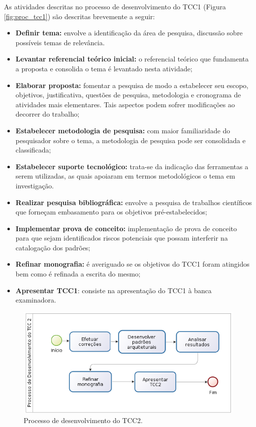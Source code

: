 As atividades descritas no processo de desenvolvimento do TCC1 (Figura \ref{fig:proc_tcc1}) são descritas brevemente a seguir:

\begin{itemize}
    \item \textbf{Definir tema:} envolve a identificação da área de pesquisa, discussão sobre possíveis temas de relevância.
    \item \textbf{Levantar referencial teórico inicial:} o referencial teórico que fundamenta a proposta e consolida o tema é levantado nesta atividade;
    \item \textbf{Elaborar proposta:} fomentar a pesquisa de modo a estabelecer seu escopo, objetivos, justificativa, questões de pesquisa, metodologia e cronograma de atividades mais elementares. Tais aspectos podem sofrer modificações ao decorrer do trabalho;
    \item \textbf{Estabelecer metodologia de pesquisa:} com maior familiaridade do pesquisador sobre o tema, a metodologia de pesquisa pode ser consolidada e classificada;
    \item \textbf{Estabelecer suporte tecnológico:} trata-se da indicação das ferramentas a serem utilizadas, as quais apoiaram em termos metodológicos o tema em investigação.
    \item \textbf{Realizar pesquisa bibliográfica:} envolve a pesquisa de trabalhos científicos que forneçam embasamento para os objetivos pré-estabelecidos;
    \item \textbf{Implementar prova de conceito:} implementação de prova de conceito para que sejam  identificados riscos potenciais que possam interferir na catalogação dos padrões;
    \item \textbf{Refinar monografia:} é averiguado se os objetivos do TCC1 foram atingidos bem como é refinada a escrita do mesmo;
    \item \textbf{Apresentar TCC1}: consiste na apresentação do TCC1 à banca examinadora.
\end{itemize}



\begin{figure}[!htb]
\centering
\includegraphics[scale=0.6]{figuras/processo_tcc2}
\caption{Processo de desenvolvimento do TCC2.}
\label{fig:proc_tcc2}
\end{figure}

